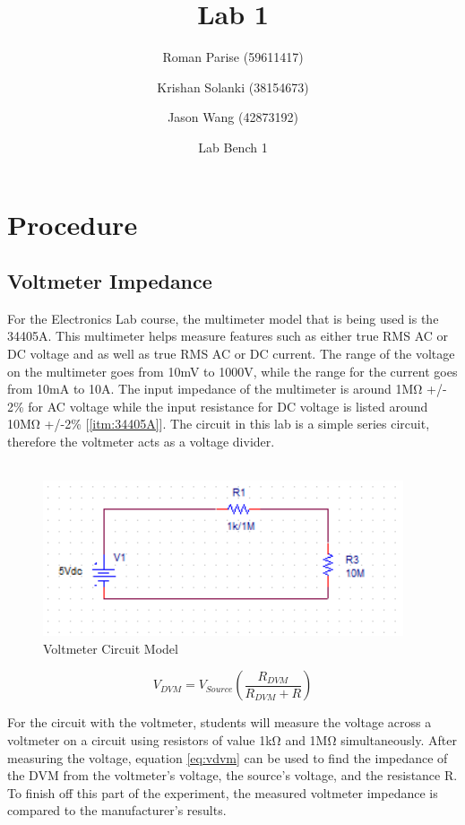 \documentclass[a4paper,titlepage,10pt]{article}
\title{Lab 1}
\author{
Roman Parise (59611417) \and
Krishan Solanki (38154673) \and
Jason Wang (42873192) \and
Lab Bench 1}
\begin{document}
\maketitle

\section{Procedure}
\subsection{Voltmeter Impedance}
%
For the Electronics Lab course, the multimeter model that is being used is the 34405A. This multimeter helps measure features such as either true RMS AC or DC voltage and as well as true RMS AC or DC current. The range of the voltage on the multimeter goes from 10mV to 1000V, while the range for the current goes from 10mA to 10A. The input impedance of the multimeter is around 1M\si{\ohm} +/- 2\% for AC voltage while the input resistance for DC voltage is listed around 10M\si{\ohm} +/-2\% [\ref{itm:34405A}]. The circuit in this lab is a simple series circuit, therefore the voltmeter acts as a voltage divider.\\
\\

\begin{figure}[h!]
\centering
\includegraphics{voltmeterfinal.PNG}
\caption{Voltmeter Circuit Model}
\label{fig:Voltmeter_Pic}
\end{figure}

\begin{equation}
	\label{eq:vdvm}
	V_{DVM} = V_{Source}(\frac{R_{DVM}}{R_{DVM} + R}) 
\end{equation}

For the circuit with the voltmeter, students will measure the voltage across a voltmeter on a circuit using resistors of value 1kΩ and 1MΩ simultaneously. After measuring the voltage, equation \ref{eq:vdvm} can be used to find the impedance of the DVM from the voltmeter's voltage, the source's voltage, and the resistance R. To finish off this part of the experiment, the measured voltmeter impedance is compared to the manufacturer's results. 
\end{document}
